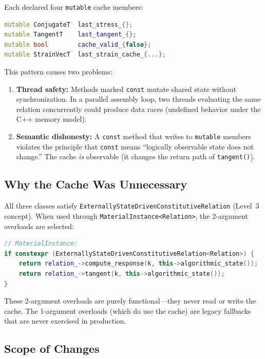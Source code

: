 Each declared four \texttt{mutable} cache members:
\begin{lstlisting}[language=C++, basicstyle=\ttfamily\small]
mutable ConjugateT  last_stress_{};
mutable TangentT    last_tangent_{};
mutable bool        cache_valid_{false};
mutable StrainVecT  last_strain_cache_{...};
\end{lstlisting}

This pattern causes two problems:
\begin{enumerate}
  \item \textbf{Thread safety:}
        Methods marked \texttt{const} mutate shared state without
        synchronization.  In a parallel assembly loop, two threads
        evaluating the same relation concurrently could produce data
        races (undefined behavior under the C++ memory model).

  \item \textbf{Semantic dishonesty:}
        A \texttt{const} method that writes to \texttt{mutable}
        members violates the principle that \texttt{const} means
        ``logically observable state does not change.''
        The cache \emph{is} observable (it changes the return path
        of \texttt{tangent()}).
\end{enumerate}

\subsection{Why the Cache Was Unnecessary}

All three classes satisfy \texttt{ExternallyStateDrivenConstitutiveRelation}
(Level~3 concept).  When used through \texttt{MaterialInstance<Relation>},
the 2-argument overloads are selected:
\begin{lstlisting}[language=C++, basicstyle=\ttfamily\small]
// MaterialInstance:
if constexpr (ExternallyStateDrivenConstitutiveRelation<Relation>) {
    return relation_->compute_response(k, this->algorithmic_state());
    return relation_->tangent(k, this->algorithmic_state());
}
\end{lstlisting}
These 2-argument overloads are purely functional---they never read or
write the cache.  The 1-argument overloads (which do use the cache)
are legacy fallbacks that are never exercised in production.

\subsection{Scope of Changes}

